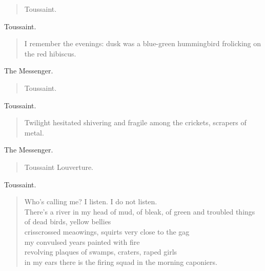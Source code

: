 \documentclass[letterpaper,article,12pt,oneside,notitlepage]{memoir}
\begin{document}
\begin{verse}
Toussaint. \\
\end{verse}

\begin{center}Toussaint.\end{center}

\begin{verse}
\indent I remember the evenings: dusk was a blue-green hummingbird frolicking on the red hibiscus. \\
\end{verse}

\begin{center}The Messenger.\end{center}

\begin{verse}
Toussaint. \\
\end{verse}

\begin{center}Toussaint.\end{center}

\begin{verse}
Twilight hesitated shivering and fragile among the crickets, scrapers of metal. \\
\end{verse}

\begin{center}The Messenger.\end{center}

\begin{verse}
Toussaint Louverture. \\
\end{verse}

\begin{center}Toussaint.\end{center}

\begin{verse}
Who's calling me? I listen. I do not listen. \\
There's a river in my head of mud, of bleak, of green and troubled things  \\
of dead birds, yellow bellies \\
crisscrossed meaowings, squirts very close to the gag \\
my convulsed years painted with fire \\
revolving plaques of swamps, craters, raped girls \\
in my ears there is the firing squad in the morning caponiers. \\
\end{verse}
\end{document}
